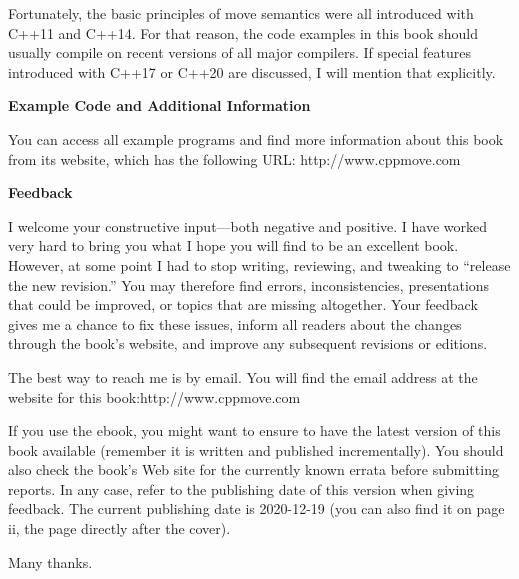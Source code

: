 Fortunately, the basic principles of move semantics were all introduced with C++11 and C++14. For that reason, the code examples in this book should usually compile on recent versions of all major compilers. If special features introduced with C++17 or C++20 are discussed, I will mention that explicitly.\par

\hspace*{\fill} \par %
\textbf{Example Code and Additional Information}

You can access all example programs and find more information about this book from its website, which has the following URL: http://www.cppmove.com\par

\hspace*{\fill} \par %
\textbf{Feedback}

I welcome your constructive input—both negative and positive. I have worked very hard to bring you what I hope you will find to be an excellent book. However, at some point I had to stop writing, reviewing, and tweaking to “release the new revision.” You may therefore find errors, inconsistencies, presentations that could be improved, or topics that are missing altogether. Your feedback gives me a chance to fix these issues, inform all readers about the changes through the book’s website, and improve any subsequent revisions or editions.\par

The best way to reach me is by email. You will find the email address at the website for this book:http://www.cppmove.com\par

If you use the ebook, you might want to ensure to have the latest version of this book available (remember it is written and published incrementally). You should also check the book’s Web site for the currently known errata before submitting reports. In any case, refer to the publishing date of this version when giving feedback. The current publishing date is 2020-12-19 (you can also find it on page ii, the page directly after the cover).\par

Many thanks.\par

\newpage




















